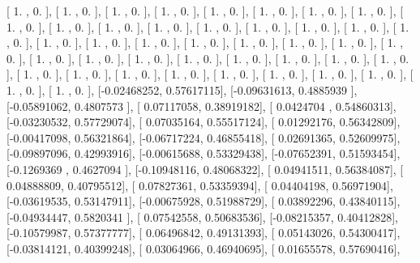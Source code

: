 \documentclass{article}
\begin{document}
       [ 1.        ,  0.        ],
       [ 1.        ,  0.        ],
       [ 1.        ,  0.        ],
       [ 1.        ,  0.        ],
       [ 1.        ,  0.        ],
       [ 1.        ,  0.        ],
       [ 1.        ,  0.        ],
       [ 1.        ,  0.        ],
       [ 1.        ,  0.        ],
       [ 1.        ,  0.        ],
       [ 1.        ,  0.        ],
       [ 1.        ,  0.        ],
       [ 1.        ,  0.        ],
       [ 1.        ,  0.        ],
       [ 1.        ,  0.        ],
       [ 1.        ,  0.        ],
       [ 1.        ,  0.        ],
       [ 1.        ,  0.        ],
       [ 1.        ,  0.        ],
       [ 1.        ,  0.        ],
       [ 1.        ,  0.        ],
       [ 1.        ,  0.        ],
       [ 1.        ,  0.        ],
       [ 1.        ,  0.        ],
       [ 1.        ,  0.        ],
       [ 1.        ,  0.        ],
       [ 1.        ,  0.        ],
       [ 1.        ,  0.        ],
       [ 1.        ,  0.        ],
       [ 1.        ,  0.        ],
       [ 1.        ,  0.        ],
       [ 1.        ,  0.        ],
       [ 1.        ,  0.        ],
       [ 1.        ,  0.        ],
       [ 1.        ,  0.        ],
       [ 1.        ,  0.        ],
       [ 1.        ,  0.        ],
       [ 1.        ,  0.        ],
       [ 1.        ,  0.        ],
       [ 1.        ,  0.        ],
       [ 1.        ,  0.        ],
       [ 1.        ,  0.        ],
       [ 1.        ,  0.        ],
       [-0.02468252,  0.57617115],
       [-0.09631613,  0.4885939 ],
       [-0.05891062,  0.4807573 ],
       [ 0.07117058,  0.38919182],
       [ 0.0424704 ,  0.54860313],
       [-0.03230532,  0.57729074],
       [ 0.07035164,  0.55517124],
       [ 0.01292176,  0.56342809],
       [-0.00417098,  0.56321864],
       [-0.06717224,  0.46855418],
       [ 0.02691365,  0.52609975],
       [-0.09897096,  0.42993916],
       [-0.00615688,  0.53329438],
       [-0.07652391,  0.51593454],
       [-0.1269369 ,  0.4627094 ],
       [-0.10948116,  0.48068322],
       [ 0.04941511,  0.56384087],
       [ 0.04888809,  0.40795512],
       [ 0.07827361,  0.53359394],
       [ 0.04404198,  0.56971904],
       [-0.03619535,  0.53147911],
       [-0.00675928,  0.51988729],
       [ 0.03892296,  0.43840115],
       [-0.04934447,  0.5820341 ],
       [ 0.07542558,  0.50683536],
       [-0.08215357,  0.40412828],
       [-0.10579987,  0.57377777],
       [ 0.06496842,  0.49131393],
       [ 0.05143026,  0.54300417],
       [-0.03814121,  0.40399248],
       [ 0.03064966,  0.46940695],
       [ 0.01655578,  0.57690416],
\end{document}
